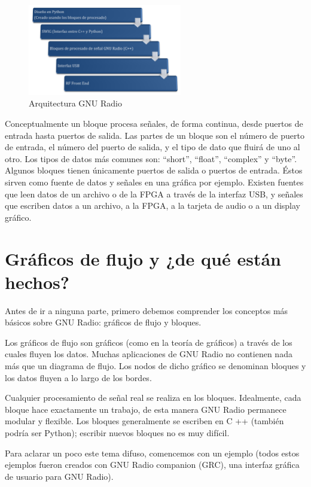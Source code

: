 \begin{figure}[htb]
\centering
\includegraphics[width=0.6\textwidth]{capitulo1/ArqGNURadio.png}
\caption{Arquitectura GNU Radio}
\label{cap1:004}
\end{figure}

Conceptualmente un bloque procesa señales, de forma continua, desde puertos de entrada
hasta puertos de salida. Las partes de un bloque son el número de puerto de entrada, el número del puerto de salida, y el tipo de dato que fluirá de uno al otro. Los tipos de datos más comunes son: ``short'', ``float'', ``complex'' y ``byte''.
Algunos bloques tienen únicamente puertos de salida o puertos de entrada. Éstos sirven como
fuente de datos y señales en una gráfica por ejemplo. Existen fuentes que leen datos de un
archivo o de la FPGA a través de la interfaz USB, y señales que escriben datos a un archivo, a la FPGA, a la tarjeta de audio o a un display gráfico.

\section{Gráficos de flujo y ¿de qué están hechos?}

Antes de ir a ninguna parte, primero debemos comprender los conceptos más básicos sobre GNU Radio: gráficos de flujo y bloques.

Los gráficos de flujo son gráficos (como en la teoría de gráficos) a través de los cuales fluyen los datos. Muchas aplicaciones de GNU Radio no contienen nada más que un diagrama de flujo. Los nodos de dicho gráfico se denominan bloques y los datos fluyen a lo largo de los bordes.

Cualquier procesamiento de señal real se realiza en los bloques. Idealmente, cada bloque hace exactamente un trabajo, de esta manera GNU Radio permanece modular y flexible. Los bloques generalmente se escriben en C ++ (también podría ser Python); escribir nuevos bloques no es muy difícil.

Para aclarar un poco este tema difuso, comencemos con un ejemplo (todos estos ejemplos fueron creados con GNU Radio companion (GRC), una interfaz gráfica de usuario para GNU Radio).

